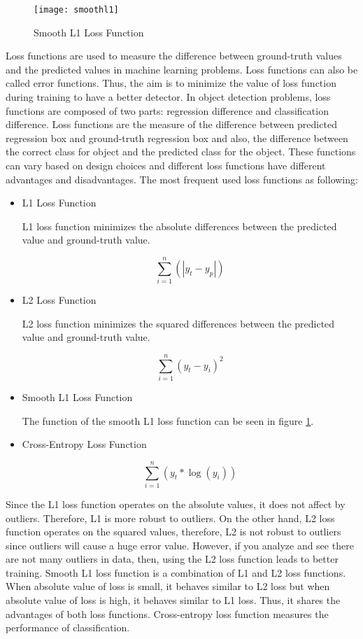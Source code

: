 \documentclass{article}
\begin{document}
\setlength{\parindent}{6ex}

\begin{figure}
    \centering
    \texttt{[image: smoothl1]}
    \caption{Smooth L1 Loss Function}
    \label{fig:smoothl11}
\end{figure}
\indent

Loss functions are used to measure the difference between ground-truth 
values and the predicted values in machine learning problems. Loss 
functions can also be called error functions. Thus, the aim is to minimize 
the value of loss function during training to have a better detector. 
In object detection problems, loss functions are composed of two parts: 
regression difference and classification difference. Loss functions are 
the measure of the difference between predicted regression box and 
ground-truth regression box and also, the difference between the correct 
class for object and the predicted class for the object. These functions can 
vary based on design choices and different loss functions have different 
advantages and disadvantages. The most frequent used loss functions as 
following:
\begin{itemize}
    \item L1 Loss Function
    
    L1 loss function minimizes the absolute differences between the
    predicted value and ground-truth value.

    $$\sum_{i=1}^{n} (|y_t - y_p|)$$

    \item L2 Loss Function
    
    L2 loss function minimizes the squared differences between the 
    predicted value and ground-truth value.

    $$\sum_{i=1}^{n} (y_t - y_i)^{2}$$

    \item Smooth L1 Loss Function
    
    The function of the smooth L1 loss function can be seen 
    in figure \ref{fig:smoothl11}.

    \item Cross-Entropy Loss Function

    $$\sum_{i=1}^{n} (y_t * \log (y_i))$$

\end{itemize}    
\indent

Since the L1 loss function operates on the absolute values, it does not 
affect by outliers. Therefore, L1 is more robust to outliers. On the
other hand, L2 loss function operates on the squared values, therefore, 
L2 is not robust to outliers since outliers will cause a huge error value. 
However, if you analyze and see there are not many outliers in data, then, 
using the L2 loss function leads to better training. Smooth L1 loss function is a 
combination of L1 and L2 loss functions. When absolute value of loss is small, it 
behaves similar to L2 loss but when absolute value of loss is high, it behaves 
similar to L1 loss. Thus, it shares the advantages of both loss functions. Cross-entropy 
loss function measures the performance of classification. 
\end{document}
